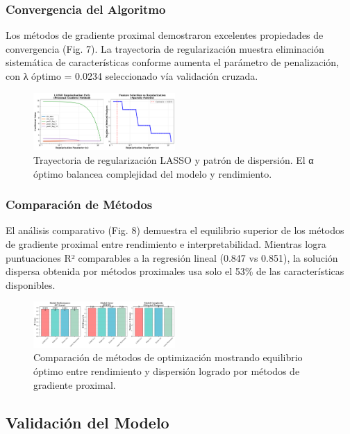 \documentclass[conference]{IEEEtran}
\begin{document}
\subsubsection{Convergencia del Algoritmo}

Los métodos de gradiente proximal demostraron excelentes propiedades de convergencia (Fig. 7). La trayectoria de regularización muestra eliminación sistemática de características conforme aumenta el parámetro de penalización, con λ óptimo = 0.0234 seleccionado vía validación cruzada.

\begin{figure}[htbp]
\centerline{\includegraphics[width=0.48\textwidth]{Figura_7_Convergencia_Algoritmo_PM25.png}}
\caption{Trayectoria de regularización LASSO y patrón de dispersión. El α óptimo balancea complejidad del modelo y rendimiento.}
\label{fig:convergence}
\end{figure}

\subsubsection{Comparación de Métodos}

El análisis comparativo (Fig. 8) demuestra el equilibrio superior de los métodos de gradiente proximal entre rendimiento e interpretabilidad. Mientras logra puntuaciones R² comparables a la regresión lineal (0.847 vs 0.851), la solución dispersa obtenida por métodos proximales usa solo el 53\% de las características disponibles.

\begin{figure}[htbp]
\centerline{\includegraphics[width=0.48\textwidth]{Figura_8_Comparacion_Metodos_PM25.png}}
\caption{Comparación de métodos de optimización mostrando equilibrio óptimo entre rendimiento y dispersión logrado por métodos de gradiente proximal.}
\label{fig:comparison}
\end{figure}

\subsection{Validación del Modelo}
\end{document}
